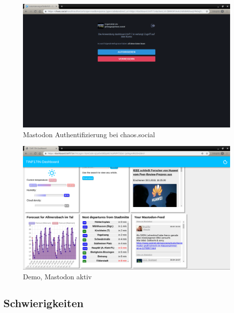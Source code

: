 \documentclass[fleqn,10pt]{SelfArx} %
\begin{document}
\begin{figure}
\includegraphics[width=\linewidth]{images/2.png}
\caption{Mastodon Authentifizierung bei chaos.social}
\label{fig:demo2}
\end{figure}

\begin{figure}
	\includegraphics[width=\linewidth]{images/3.png}
	\caption{Demo, Mastodon aktiv}
	\label{fig:demo3}
\end{figure}
\subsection{Schwierigkeiten}



\printbibliography%
\end{document}
